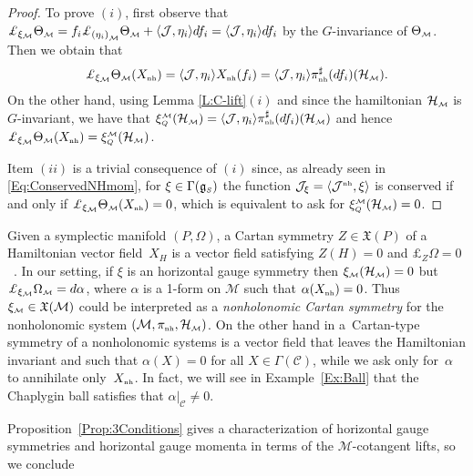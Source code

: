 \documentclass[pdftex]{sigma}
\numberwithin{equation}{section}
\def\M{\mathcal{M}}
\def\J{\mathcal{J}}
\def\C{\mathcal{C}}
\def\Ham{\mathcal{H}}
\def\g{\mathfrak{g}}
\def\nh{{\mbox{\tiny{nh}}}}
\def\subM{{\mbox{\tiny{$\M$}}}}
\def\subSS{{\mbox{\tiny{$S$}}}}
\begin{document}
\begin{proof}
To prove $(i)$,  f\/irst observe that $\pounds_{\xi_\M}\Theta_\subM  = f_i   \pounds_{{(\eta_i)}_\M} \Theta_\subM + \langle{\mathcal J}, \eta_i \rangle df_i= \langle{\mathcal J}, \eta_i \rangle df_i$ by the $G$-invariance of $\Theta_\subM$. Then we obtain that
\begin{gather*}
\pounds_{\xi_\M}\Theta_\subM (X_\nh) = \langle{\mathcal J}, \eta_i \rangle X_\nh(f_i) = \langle{\mathcal J}, \eta_i \rangle \pi^\sharp_\nh(df_i) (\Ham_\subM).
\end{gather*}
On the other hand, using Lemma \ref{L:C-lift}$(i)$ and since the hamiltonian $\Ham_\subM$ is $G$-invariant, we have that $\xi_{\mbox{\tiny{$Q$}}}^{\subM} (\Ham_\subM) =   \langle \J,\eta_i\rangle    \pi_\nh^\sharp(df_i)  (\Ham_\subM)$ and hence $\pounds_{\xi_\M} \Theta_\subM (X_{\nh})  = \xi_{\mbox{\tiny{$Q$}}}^\subM (\Ham_\subM)$.

Item $(ii)$ is a trivial consequence of $(i)$ since, as already seen in \eqref{Eq:ConservedNHmom}, for $\xi\in\Gamma(\g_\subSS)$ the function ${\mathcal J}_\xi = \langle{\mathcal J}^{\nh}, \xi\rangle$ is conserved if and only if $\pounds_{\xi_\M} \Theta_\subM (X_\nh) = 0$, which is equivalent to ask for $\xi_{\mbox{\tiny{$Q$}}}^\subM (\Ham_\subM)=0$.
\end{proof}

\begin{Remark}\label{R:Cartan}
Given a symplectic manifold $(P, \Omega)$, a Cartan symmetry $Z\in \mathfrak{X}(P)$ of a Hamiltonian vector f\/ield~$X_H$ is a vector f\/ield satisfying $Z(H)=0$ and $\pounds_{Z}\Omega=0$~\cite{Book:Crampin}.  In our setting, if $\xi$ is an horizontal gauge symmetry then $\xi_\subM(\Ham_\subM) = 0$ but $\pounds_{\xi_\subM} \Omega_\subM = d\alpha$, where $\alpha$ is a 1-form on $\M$ such that $\alpha(X_\nh) = 0$. Thus $\xi_\subM\in\mathfrak{X}(\M)$ could be interpreted as a {\it nonholonomic Cartan symmetry} for the nonholonomic system $(\M, \pi_\nh, \Ham_\subM)$.
On the other hand in \cite[Theorem~1]{Crampin-Mestdag} a~Cartan-type symmetry of a nonholonomic
systems is a vector f\/ield that
leaves the Hamiltonian invariant and such that $\alpha(X)=0$ for all $X\in \Gamma(\C)$, while we
ask only for~$\alpha$ to annihilate only~$X_\nh$. In fact, we will see in Example~\ref{Ex:Ball} that the Chaplygin ball satisf\/ies that $\alpha |_\C \neq 0$.
\end{Remark}

Proposition~\ref{Prop:3Conditions} gives a characterization of horizontal gauge symmetries and horizontal gauge momenta in terms of the $\M$-cotangent lifts, so we conclude
\end{document}
